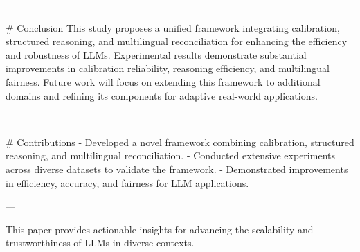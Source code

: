 ---

# Conclusion  
This study proposes a unified framework integrating calibration, structured reasoning, and multilingual reconciliation for enhancing the efficiency and robustness of LLMs. Experimental results demonstrate substantial improvements in calibration reliability, reasoning efficiency, and multilingual fairness. Future work will focus on extending this framework to additional domains and refining its components for adaptive real-world applications.

---

# Contributions  
- Developed a novel framework combining calibration, structured reasoning, and multilingual reconciliation.  
- Conducted extensive experiments across diverse datasets to validate the framework.  
- Demonstrated improvements in efficiency, accuracy, and fairness for LLM applications.  

--- 

This paper provides actionable insights for advancing the scalability and trustworthiness of LLMs in diverse contexts.